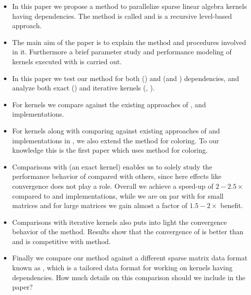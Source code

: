 \begin{itemize}
	\item In this paper we propose a method to parallelize sparse linear algebra kernels having dependencies. The method is called \RACE and is a recursive level-based approach.  
	
	\item The main aim of the paper is to explain the \RACE method and procedures involved in it. Furthermore a brief parameter study and performance modeling of kernels executed with \RACE is carried out.
	
	\item In this paper we test our method for both \DONE (\GS) and \DTWO (\SymmSpmv and \KACZ) dependencies, and analyze both exact (\SymmSpmv) and iterative kernels (\GS, \KACZ).
	
	\item For \DONE kernels we compare against the existing approaches of \MC \cite{MC}, \ABMC \cite{ABMC} and \MKL \cite{MKL} implementations.
	
	\item For \DTWO kernels along with comparing against existing approaches of \MC \cite{feast_mc} and implementations in \MKL \cite{MKL}, we also extend the \ABMC method for \DTWO coloring. To our knowledge this is the first paper which uses \ABMC method for \DTWO coloring.
	
	\item Comparisons with \SymmSpmv (an exact kernel) enables us to solely study the performance behavior of \RACE compared with others, since here effects like convergence does not play a role. Overall we achieve a speed-up of $2-2.5 \times$ compared to \MC and \MKL implementations, while we are on par with \ABMC for small matrices and for large matrices we gain almost a factor of $1.5-2 \times$ benefit. 
	
	\item Comparisons with iterative kernels also puts into light the convergence behavior of the method. Results show that the convergence of \RACE is better than \MC and is competitive with \ABMC method.
	
	\item Finally we compare our method against a different sparse matrix data format known as \RSB, which is a tailored data format for working on kernels having dependencies. How much details on this comparison should we include in the paper? 
\end{itemize}